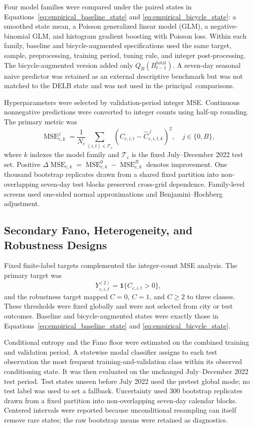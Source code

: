 \documentclass[applsci,article,accept,moreauthors]{Definitions/mdpi}
\begin{document}
Four model families were compared under the paired states in
Equations~\eqref{eq:empirical_baseline_state} and
\eqref{eq:empirical_bicycle_state}: a smoothed state mean, a Poisson
generalized linear model (GLM), a negative-binomial GLM, and histogram
gradient boosting with Poisson loss. Within each family, baseline and
bicycle-augmented specifications used the same target, sample, preprocessing,
training period, tuning rule, and integer post-processing. The bicycle-augmented
version added only \(Q_B(B^{\mathrm{total}}_{t-1})\). A seven-day seasonal
naive predictor was retained as an external descriptive benchmark but was
not matched to the DELB state and was not used in the principal~comparisons.

Hyperparameters were selected by validation-period integer MSE. Continuous
nonnegative predictions were converted to integer counts using half-up
rounding. The primary metric was
\begin{equation}
\operatorname{MSE}^{j}_{c,k}
=\frac{1}{N_c}\sum_{(i,t)\in\mathcal T_c}
\left(C_{c,i,t}-\widehat C^{\,j}_{c,i,t,k}\right)^2,
\quad j\in\{0,B\},
\label{eq:empirical_mse}
\end{equation}
where \(k\) indexes the model family and \(\mathcal T_c\) is the fixed
July--December 2022 test set. Positive
\(\Delta\operatorname{MSE}_{c,k}
=\operatorname{MSE}^{0}_{c,k}-\operatorname{MSE}^{B}_{c,k}\)
denotes improvement. {One thousand bootstrap replicates drawn from a
shared fixed partition into non-overlapping seven-day test blocks preserved
cross-grid dependence.} Family-level screens used
one-sided normal approximations and Benjamini--Hochberg adjustment.

\subsection{Secondary Fano, Heterogeneity, and Robustness Designs}
\label{subsec:fano_validation_methods}

Fixed finite-label targets complemented the integer-count MSE analysis. The
primary target was
\[
Y^{(2)}_{c,i,t}=\mathbf 1\{C_{c,i,t}>0\},
\]
and the robustness target mapped \(C=0\), \(C=1\), and \(C\geq2\) to three
classes. These thresholds were fixed globally and were not selected from
city or test outcomes. Baseline and bicycle-augmented states were exactly those
in Equations~\eqref{eq:empirical_baseline_state} and
\eqref{eq:empirical_bicycle_state}.

Conditional entropy and the Fano floor were estimated on the combined
training and validation period. {A statewise modal classifier assigns to
each test observation the most frequent training-and-validation class within
its observed conditioning state.} It was then evaluated on the unchanged
July--December 2022 test period. Test states
unseen before July 2022 used the pretest global mode; no test label was used
to set a fallback. {Uncertainty used 300 bootstrap replicates drawn from
a fixed partition into non-overlapping seven-day calendar blocks.} Centered intervals were reported because
unconditional resampling can itself remove rare states; the raw bootstrap
means were retained as diagnostics.
\end{document}

